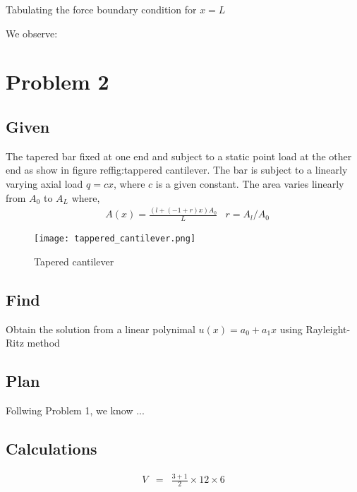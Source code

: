 \documentclass[a4paper]{memoir}
\begin{document}
Tabulating the force boundary condition for $x=L$

\begin{table*}[htbp]
	\centering
		\begin{tabular}
			
		\end{tabular}
	\caption{Force Boundary Conditions at $x=L$}
	\label{tab:ForceBoundaryConditionsAtXL}
\end{table*}

We observe: 

\section{Problem 2}
\subsection{Given}
The tapered bar fixed at one end and subject to a static point load at the other end as show in figure ref{fig:tappered cantilever}.
The bar is subject to a linearly varying axial load $q=cx$, where $c$ is a given constant. The area varies linearly from $A_0$ to $A_L$ where,
\begin{align*}
	&A(x) = \frac{(l+(-1+r)x)A_0}{L}	& r = A_l/A_0
\end{align*}

\begin{figure}
	\centering
		\texttt{[image: tappered\_cantilever.png]}
	\caption{Tapered cantilever}
	\label{fig:tappered_cantilever}
\end{figure}

\subsection{Find}
Obtain the solution from a linear polynimal $u(x) = a_0+a_1x$ using Rayleight-Ritz method 

\subsection{Plan}
Follwing Problem 1, we know ...

\subsection{Calculations}
\begin{eqnarray*}
V &=& \frac{3+1}{2} \times 12 \times 6
\end{eqnarray*}
\end{document}

